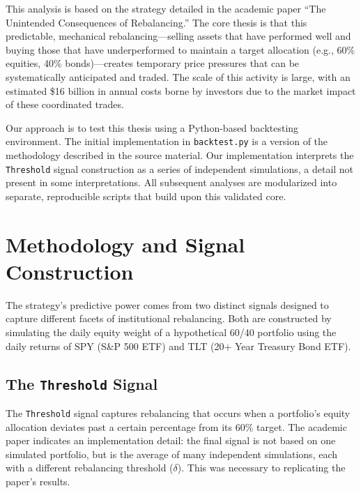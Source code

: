 \documentclass{article}
\begin{document}
This analysis is based on the strategy detailed in the academic paper ``The Unintended Consequences of Rebalancing.'' The core thesis is that this predictable, mechanical rebalancing---selling assets that have performed well and buying those that have underperformed to maintain a target allocation (e.g., 60\% equities, 40\% bonds)---creates temporary price pressures that can be systematically anticipated and traded. The scale of this activity is large, with an estimated \$16 billion in annual costs borne by investors due to the market impact of these coordinated trades.

Our approach is to test this thesis using a Python-based backtesting environment. The initial implementation in \texttt{backtest.py} is a version of the methodology described in the source material. Our implementation interprets the \texttt{Threshold} signal construction as a series of independent simulations, a detail not present in some interpretations. All subsequent analyses are modularized into separate, reproducible scripts that build upon this validated core.

\section{Methodology and Signal Construction}
The strategy's predictive power comes from two distinct signals designed to capture different facets of institutional rebalancing. Both are constructed by simulating the daily equity weight of a hypothetical 60/40 portfolio using the daily returns of SPY (S\&P 500 ETF) and TLT (20+ Year Treasury Bond ETF).

\subsection{The \texttt{Threshold} Signal}
The \texttt{Threshold} signal captures rebalancing that occurs when a portfolio's equity allocation deviates past a certain percentage from its 60\% target. The academic paper indicates an implementation detail: the final signal is not based on one simulated portfolio, but is the average of many independent simulations, each with a different rebalancing threshold ($\delta$). This was necessary to replicating the paper's results.
\end{document}
